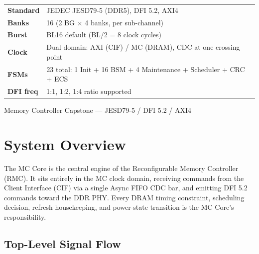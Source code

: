 \documentclass[11pt,a4paper]{article}
\begin{document}
\begin{titlepage}
\begin{center}
\end{center}

\vspace{1cm}
\begin{tabular}{@{}ll@{}}
  \textbf{Standard}    & JEDEC JESD79-5 (DDR5), DFI 5.2, AXI4 \\[2pt]
  \textbf{Banks}       & 16 (2 BG $\times$ 4 banks, per sub-channel) \\[2pt]
  \textbf{Burst}       & BL16 default (BL/2 = 8 clock cycles) \\[2pt]
  \textbf{Clock}       & Dual domain: AXI (CIF) / MC (DRAM), CDC at one crossing point \\[2pt]
  \textbf{FSMs}        & 23 total: 1 Init + 16 BSM + 4 Maintenance + Scheduler + CRC + ECS \\[2pt]
  \textbf{DFI freq}    & 1:1, 1:2, 1:4 ratio supported \\[2pt]
\end{tabular}
\vfill
{\small\color{gray}Memory Controller Capstone --- JESD79-5 / DFI 5.2 / AXI4}
\end{titlepage}

\tableofcontents\newpage

\section{System Overview}

The MC Core is the central engine of the Reconfigurable Memory Controller (RMC).
It sits entirely in the MC clock domain, receiving commands from the Client Interface
(CIF) via a single Async FIFO CDC bar, and emitting DFI 5.2 commands toward the
DDR PHY. Every DRAM timing constraint, scheduling decision, refresh housekeeping,
and power-state transition is the MC Core's responsibility.

\subsection{Top-Level Signal Flow}
\end{document}
